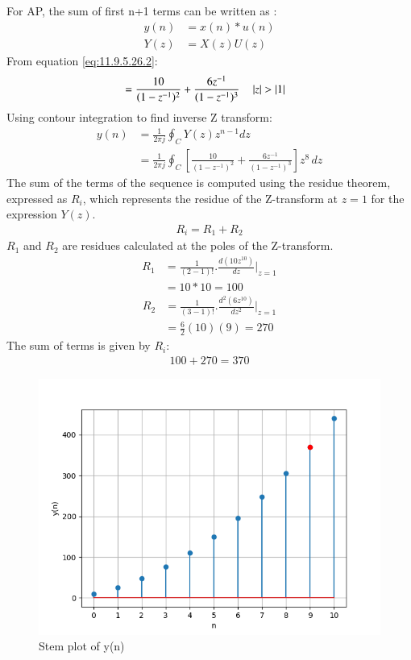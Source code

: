 \documentclass[journal,12pt,twocolumn]{IEEEtran}
\theoremstyle{remark}
\begin{document}
For AP, the sum of first n+1 terms can be written as :
\begin{align}
	 y(n)&=x(n)*u(n) \\
	 Y(z) &= X(z)U(z)
\end{align}  
From equation \eqref{eq:11.9.5.26.2}:
\begin{align}
	&=\frac{10}{(1-z^{-1})^2} + \frac{6z^{-1}}{(1-z^{-1})^3}
	\quad \left\vert z\right\vert>\left\vert1\right\vert
\end{align}
Using contour integration to find inverse Z transform:
\begin{align}
	y(n) &= \frac{1}{2\pi j} \oint_C Y(z) z^{n-1} dz\\
	&= \frac{1}{2\pi j} \oint_C [ \frac{10}{(1-z^{-1})^2} + \frac{6z^{-1}}{(1-z^{-1})^3} ]z^{8} \, dz
\end{align}
The sum of the terms of the sequence is computed using the residue theorem, expressed as $R_i$, which represents the residue of the Z-transform at $ z=1 $ for the expression $ Y(z) $.
\begin{align}
	R_i=R_1 + R_2
\end{align}
 $R_1$ and $R_2$ are residues calculated at the poles of the Z-transform.
\begin{align}
		R_1 &= \frac{1}{{(2-1)!}} . \frac{d (10z^{10})}{dz} |_{z=1} \\
	&=10*10=100
\end{align}
\begin{align}
	R_2 &= \frac{1}{{(3-1)!}} . \frac{d^2(6z^{10})}{dz^2} |_{z=1} \\
	&= \frac{6}{2}(10)(9) = 270
\end{align}
The sum of terms is given by $R_i$:
 \begin{align}
100 + 270 = 370
\end{align}
\begin{figure}
    \centering
    \includegraphics[width=\columnwidth]{figs/plot2.png}
    \caption{Stem plot of y(n)}
    \label{fig:11.9.5.8fig1}
\end{figure}
\end{document}
